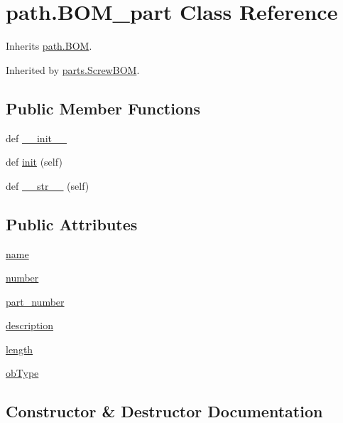 \hypertarget{classpath_1_1_b_o_m__part}{}\section{path.\+B\+O\+M\+\_\+part Class Reference}
\label{classpath_1_1_b_o_m__part}


Inherits \hyperlink{classpath_1_1_b_o_m}{path.\+B\+O\+M}.



Inherited by \hyperlink{classparts_1_1_screw_b_o_m}{parts.\+Screw\+B\+O\+M}.

\subsection*{Public Member Functions}
\begin{DoxyCompactItemize}
\item 
def \hyperlink{classpath_1_1_b_o_m__part_aab817071644f243f19d9401daea278bf}{\+\_\+\+\_\+init\+\_\+\+\_\+}
\item 
def \hyperlink{classpath_1_1_b_o_m__part_ad2528e7bad2f5188ea570949adda3c47}{init} (self)
\item 
def \hyperlink{classpath_1_1_b_o_m__part_ae748371b208706bee9ddb0412a305ac3}{\+\_\+\+\_\+str\+\_\+\+\_\+} (self)
\end{DoxyCompactItemize}
\subsection*{Public Attributes}
\begin{DoxyCompactItemize}
\item 
\hyperlink{classpath_1_1_b_o_m__part_a45cdc1504bfd55fb0bcc430165a029ef}{name}
\item 
\hyperlink{classpath_1_1_b_o_m__part_a7e678acf9d4bd2423b63c9203dc828d4}{number}
\item 
\hyperlink{classpath_1_1_b_o_m__part_abcb9678bf4b051d9aa937552149d7333}{part\+\_\+number}
\item 
\hyperlink{classpath_1_1_b_o_m__part_a57329b17627b67aae27b6cfc5e7a9fa6}{description}
\item 
\hyperlink{classpath_1_1_b_o_m__part_a15e2d4c2772fa5c901644581cf189693}{length}
\item 
\hyperlink{classpath_1_1_b_o_m__part_a31d55f12a538e30fb1dc24ea12fe4307}{ob\+Type}
\end{DoxyCompactItemize}


\subsection{Constructor \& Destructor Documentation}
\hypertarget{classpath_1_1_b_o_m__part_aab817071644f243f19d9401daea278bf}{}
